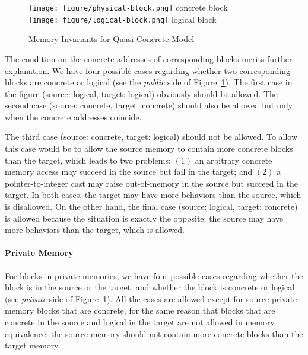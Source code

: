 \begin{figure}[t]
\center
  \begin{minipage}[b]{0.28\textwidth}
  \end{minipage}
  \begin{minipage}[b]{0.14\textwidth}
  \texttt{[image: figure/physical-block.png]} concrete block\\[2mm]
  \texttt{[image: figure/logical-block.png]} logical block\\
  \mbox{}
  \end{minipage}
\caption{Memory Invariants for Quasi-Concrete Model}\label{fig:invariant}
\end{figure}

The condition on the concrete addresses of corresponding blocks
merits further explanation. We have four possible cases
regarding whether two corresponding blocks are concrete or logical (see the
\emph{public} side of Figure~\ref{fig:invariant}).  The first case in
the figure (\ie source: logical, target: logical) obviously should be
allowed. The second case (\ie source: concrete, target: concrete)
should also be allowed but only when the concrete addresses
coincide. 

The third case (\ie source: concrete, target: logical) should not be
allowed. To allow this case would be to allow the source memory to contain more concrete
blocks than the target, which leads to two problems: $(1)$ an arbitrary
concrete memory access may succeed in the source but fail in the
target; and $(2)$ a pointer-to-integer cast may raise out-of-memory
in the source but succeed in the target.  In both cases, the target
may have more behaviors than the source, which is disallowed.  On the
other hand, the final case (\ie source: logical, target: concrete) is
allowed because the situation is exactly the opposite: the source may
have more behaviors than the target, which is allowed.

\paragraph{Private Memory}
For blocks in private memories, we have four possible cases
regarding whether the block is in the source or the target, and
whether the block is concrete or logical (see \emph{private} side of
Figure~\ref{fig:invariant}).  All the cases are allowed except for
source private memory blocks that are concrete, for the same reason
that blocks that are concrete in the source and logical in the target are not
allowed in memory equivalence: the source memory should not contain
more concrete blocks than the target memory.

